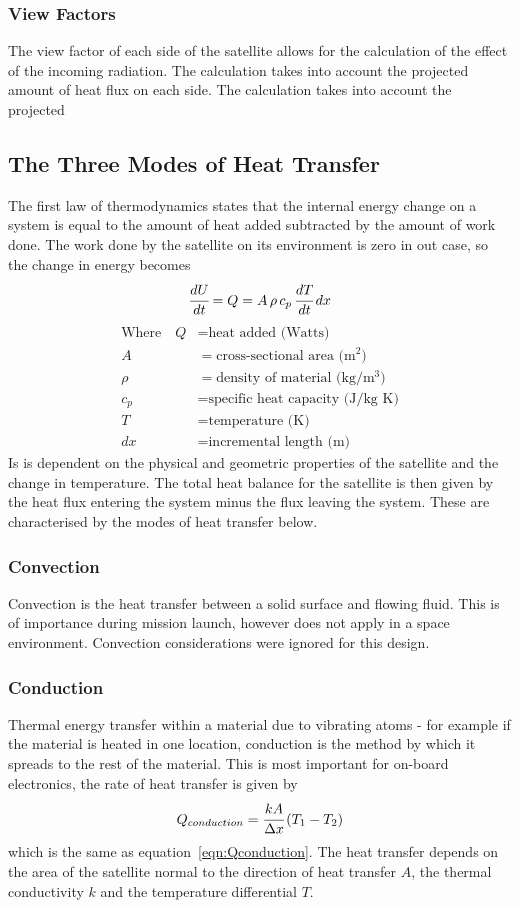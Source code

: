 \subsubsection{View Factors}
The view factor of each side of the satellite allows for the calculation of the effect of the incoming radiation. The calculation takes into account the projected amount of heat flux on each side. The calculation takes into account the projected 

\begin{figure}[H]
\end{figure}

\subsection{The Three Modes of Heat Transfer}
The first law of thermodynamics states that the internal energy change on a system is equal to the amount of heat added subtracted by the amount of work done. The work done by the satellite on its environment is zero in out case, so the change in energy becomes
\[ \cfrac{dU}{dt} = Q = A\,\rho\,c_p\,\cfrac{dT}{dt}\,dx \]
\noindent
\begin{align}
\text{Where}\quad Q &= \text{heat added (Watts)} \nonumber\\
A &= \text{cross-sectional area (m$^2$)} \nonumber\\
\rho &= \text{density of material (kg/m$^3$)} \nonumber\\
c_p &= \text{specific heat capacity (J/kg K)} \nonumber\\
T &= \text{temperature (K)} \nonumber\\
dx &= \text{incremental length (m)} \nonumber
\end{align}
Is is dependent on the physical and geometric properties of the satellite and the change in temperature. The total heat balance for the satellite is then given by the heat flux entering the system minus the flux leaving the system. These are characterised by the modes of heat transfer below.
\subsubsection{Convection}
Convection is the heat transfer between a solid surface and flowing fluid. This is of importance during mission launch, however does not apply in a space environment. Convection considerations were ignored for this design.
\subsubsection{Conduction}
Thermal energy transfer within a material due to vibrating atoms - for example if the material is heated in one location, conduction is the method by which it spreads to the rest of the material. This is most important for on-board electronics, the rate of heat transfer is given by 
\[ Q_{conduction} = \cfrac{kA}{\Delta x}\,(T_1-T_2) \]
\noindent
which is the same as equation~\ref{eqn:Qconduction}. The heat transfer depends on the area of the satellite normal to the direction of heat transfer $A$, the thermal conductivity $k$ and the temperature differential $T$.

